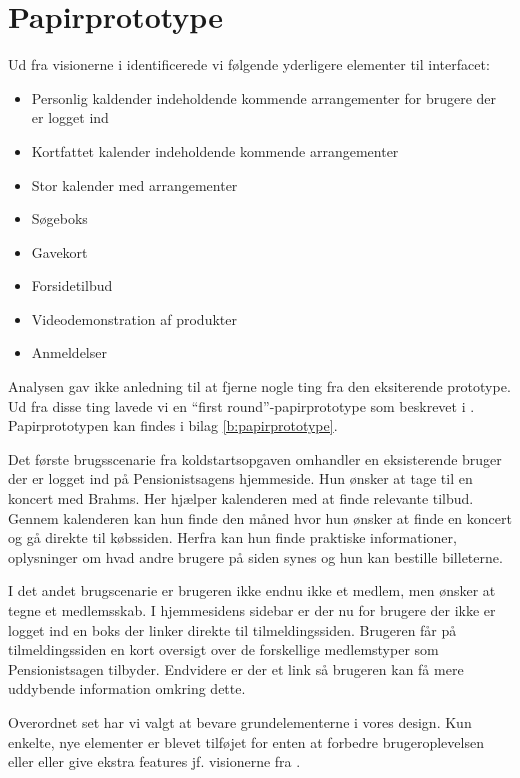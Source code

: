 \section{Papirprototype}

Ud fra visionerne i \cite{os} identificerede vi følgende yderligere
elementer til interfacet:

\begin{itemize}
    \item Personlig kaldender indeholdende kommende arrangementer for brugere
          der er logget ind
    \item Kortfattet kalender indeholdende kommende arrangementer
    \item Stor kalender med arrangementer
    \item Søgeboks
    \item Gavekort
    \item Forsidetilbud
    \item Videodemonstration af produkter
    \item Anmeldelser
\end{itemize}

Analysen gav ikke anledning til at fjerne nogle ting fra den eksiterende
prototype. Ud fra disse ting lavede vi en ``first round''-papirprototype
som beskrevet i \cite{Holtzblatt2005}. Papirprototypen kan findes i bilag
\ref{b:papirprototype}.

Det første brugsscenarie fra koldstartsopgaven omhandler en eksisterende
bruger der er logget ind på Pensionistsagens hjemmeside. Hun ønsker at tage
til en koncert med Brahms. Her hjælper kalenderen med at finde relevante
tilbud. Gennem kalenderen kan hun finde den måned hvor hun ønsker at finde
en koncert og gå direkte til købssiden. Herfra kan hun finde praktiske
informationer, oplysninger om hvad andre brugere på siden synes og hun kan
bestille billeterne.

I det andet brugscenarie er brugeren ikke endnu ikke et medlem, men ønsker at
tegne et medlemsskab. I hjemmesidens sidebar er der nu for brugere der ikke
er logget ind en boks der linker direkte til tilmeldingssiden. Brugeren får
på tilmeldingssiden en kort oversigt over de forskellige medlemstyper som
Pensionistsagen tilbyder. Endvidere er der et link så brugeren kan få mere
uddybende information omkring dette.

Overordnet set har vi valgt at bevare grundelementerne i vores design.
Kun enkelte, nye elementer er blevet tilføjet for enten at forbedre
brugeroplevelsen eller eller give ekstra features jf. visionerne fra
\cite{os}.
